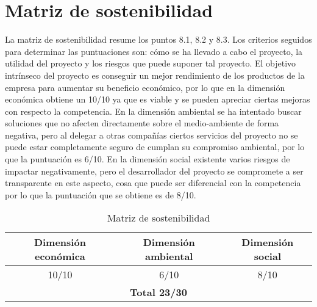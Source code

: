 \section{Matriz de sostenibilidad}
La matriz de sostenibilidad resume los puntos 8.1, 8.2 y 8.3. Los criterios seguidos para determinar las puntuaciones son: cómo se ha llevado a cabo el proyecto, la utilidad del proyecto y los riesgos que puede suponer tal proyecto.
El objetivo intrínseco del proyecto es conseguir un mejor rendimiento de los productos de la empresa para aumentar su beneficio económico, por lo que en la dimensión económica obtiene un 10/10 ya que es viable y se pueden apreciar ciertas mejoras con respecto la competencia. En la dimensión ambiental se ha intentado buscar soluciones que no afecten directamente sobre el medio-ambiente de forma negativa, pero al delegar a otras compañías ciertos servicios del proyecto no se puede estar completamente seguro de cumplan su compromiso ambiental, por lo que la puntuación es 6/10. En la dimensión social existente varios riesgos de impactar negativamente, pero el desarrollador del proyecto se compromete a ser transparente en este aspecto, cosa que puede ser diferencial con la competencia por lo que la puntuación que se obtiene es de 8/10.

\begin{table}[H]
	\centering
	\begin{tabular}{|c|c|c|}
		\hline
		\textbf{Dimensión económica} & \textbf{Dimensión ambiental} & \textbf{Dimensión social}  \\ \hline
		       10/10                 &        6/10                  &       8/10                 \\ \hline
		\multicolumn{3}{|c|}{\textbf{Total 23/30}} \\ \hline
	\end{tabular} 
	\caption{Matriz de sostenibilidad}
\end{table}
